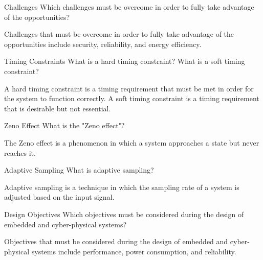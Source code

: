 \documentclass{article}
\begin{document}
\begin{exercise}{Challenges}
  Which challenges must be overcome in order to fully take advantage of the opportunities?

  \begin{solution}
    Challenges that must be overcome in order to fully take advantage of the opportunities include security, reliability, and energy efficiency.
  \end{solution}
\end{exercise}

\begin{exercise}{Timing Constraints}
  What is a hard timing constraint? What is a soft timing constraint?

  \begin{solution}
    A hard timing constraint is a timing requirement that must be met in order for the system to function correctly. A soft timing constraint is a timing requirement that is desirable but not essential.
  \end{solution}
\end{exercise}

\begin{exercise}{Zeno Effect}
  What is the "Zeno effect"?

  \begin{solution}
    The Zeno effect is a phenomenon in which a system approaches a state but never reaches it.
  \end{solution}
\end{exercise}

\begin{exercise}{Adaptive Sampling}
  What is adaptive sampling?

  \begin{solution}
    Adaptive sampling is a technique in which the sampling rate of a system is adjusted based on the input signal.
  \end{solution}
\end{exercise}

\begin{exercise}{Design Objectives}
  Which objectives must be considered during the design of embedded and cyber-physical systems?

  \begin{solution}
    Objectives that must be considered during the design of embedded and cyber-physical systems include performance, power consumption, and reliability.
  \end{solution}
\end{exercise}
\end{document}
